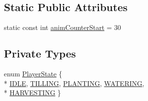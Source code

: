 \subsection*{Static Public Attributes}
\begin{DoxyCompactItemize}
\item 
static const int \hyperlink{class_player_af6cb41cc776191c988c8fa835fd12bc4}{anim\-Counter\-Start} = 30
\end{DoxyCompactItemize}
\subsection*{Private Types}
\begin{DoxyCompactItemize}
\item 
enum \hyperlink{class_player_a07fe57ec176032714d7d6de076b06ec9}{Player\-State} \{ \\*
\hyperlink{class_player_a07fe57ec176032714d7d6de076b06ec9ad7471858b0c0394b8e1521481cec80b2}{I\-D\-L\-E}, 
\hyperlink{class_player_a07fe57ec176032714d7d6de076b06ec9a02ab14770baeab752834f7c907146696}{T\-I\-L\-L\-I\-N\-G}, 
\hyperlink{class_player_a07fe57ec176032714d7d6de076b06ec9a434c19d311eb2482510d9ba5ae90c963}{P\-L\-A\-N\-T\-I\-N\-G}, 
\hyperlink{class_player_a07fe57ec176032714d7d6de076b06ec9a91bbff9d3eace1ec91fdb1113303cd04}{W\-A\-T\-E\-R\-I\-N\-G}, 
\\*
\hyperlink{class_player_a07fe57ec176032714d7d6de076b06ec9afb721b45f2c0d9ab0ec4c8c249bcb106}{H\-A\-R\-V\-E\-S\-T\-I\-N\-G}
 \}
\end{DoxyCompactItemize}


